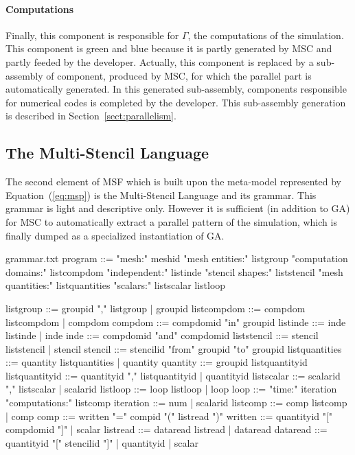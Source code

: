 \paragraph{\textbf{Computations}}
Finally, this component is responsible for $\Gamma$, \ie the computations of the simulation. This component is green and blue because it is partly generated by MSC and partly feeded by the developer. Actually, this component is replaced by a sub-assembly of component, produced by MSC, for which the parallel part is automatically generated. In this generated sub-assembly, components responsible for numerical codes is completed by the developer. This sub-assembly generation is described in Section~\ref{sect:parallelism}.

\subsection{The Multi-Stencil Language}

The second element of MSF which is built upon the meta-model represented by Equation~(\ref{eq:msp}) is the Multi-Stencil Language and its grammar. This grammar is light and descriptive only. However it is sufficient (in addition to GA) for MSC to automatically extract a parallel pattern of the simulation, which is finally dumped as a specialized instantiation of GA.

\begin{filecontents*}{grammar.txt}
program ::= "mesh:" meshid 
            "mesh entities:" listgroup
            "computation domains:" listcompdom
            "independent:" listinde
            "stencil shapes:" liststencil
            "mesh quantities:" listquantities
            "scalars:" listscalar
            listloop

listgroup ::= groupid "," listgroup | groupid
listcompdom ::= compdom listcompdom | compdom
compdom ::= compdomid "in" groupid
listinde ::= inde listinde | inde
inde ::= compdomid "and" compdomid
liststencil ::= stencil liststencil | stencil
stencil ::= stencilid "from" groupid "to" groupid
listquantities ::= quantity listquantities |  quantity
quantity ::= groupid listquantityid
listquantityid ::= quantityid "," listquantityid |  quantityid
listscalar ::= scalarid "," listscalar | scalarid
listloop ::= loop listloop | loop
loop ::=  "time:" iteration
          "computations:" listcomp
iteration ::= num | scalarid
listcomp ::= comp listcomp |  comp
comp ::= written "=" compid "(" listread ")"
written ::= quantityid "[" compdomid "]" | scalar
listread ::= dataread listread | dataread
dataread ::= quantityid "[" stencilid "]" |  quantityid | scalar
\end{filecontents*}

